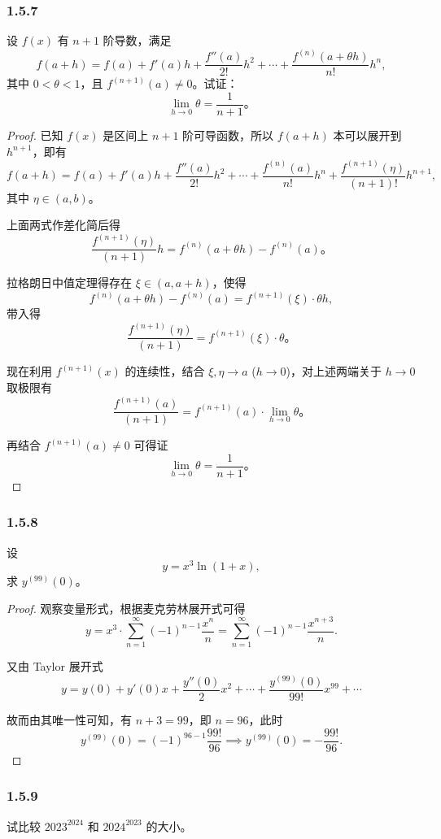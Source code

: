\documentclass[12pt]{ctexart}
\begin{document}
\subsubsection*{1.5.7}
设 $f(x)$ 有 $n+1$ 阶导数，满足
\[
f(a+h) = f(a) + f'(a)h + \frac{f''(a)}{2!}h^2 + \cdots + \frac{f^{(n)}(a+\theta h)}{n!}h^n,
\]
其中 $0 < \theta < 1$，且 $f^{(n+1)}(a) \neq 0$。试证：
\[
\lim_{h \to 0} \theta = \frac{1}{n+1}。
\]

\begin{proof}
已知 $f(x)$ 是区间上 $n+1$ 阶可导函数，所以 $f(a+h)$ 本可以展开到 $h^{n+1}$，即有
\[
f(a+h) = f(a) + f'(a)h + \frac{f''(a)}{2!}h^2 + \cdots + \frac{f^{(n)}(a)}{n!}h^n + \frac{f^{(n+1)}(\eta)}{(n+1)!}h^{n+1},
\]
其中 $\eta \in (a, b)$。

上面两式作差化简后得
\[
\frac{f^{(n+1)}(\eta)}{(n+1)}h = f^{(n)}(a + \theta h) - f^{(n)}(a)。
\]

拉格朗日中值定理得存在 $\xi \in (a, a + h)$，使得
\[
f^{(n)}(a + \theta h) - f^{(n)}(a) = f^{(n+1)}(\xi) \cdot \theta h,
\]
带入得
\[
\frac{f^{(n+1)}(\eta)}{(n+1)} = f^{(n+1)}(\xi) \cdot \theta。
\]

现在利用 $f^{(n+1)}(x)$ 的连续性，结合 $\xi, \eta \to a$ ($h \to 0$)，对上述两端关于 $h \to 0$ 取极限有
\[
\frac{f^{(n+1)}(a)}{(n+1)} = f^{(n+1)}(a) \cdot \lim_{h \to 0} \theta。
\]

再结合 $f^{(n+1)}(a) \neq 0$ 可得证
\[
\lim_{h \to 0} \theta = \frac{1}{n+1}。
\]
\end{proof}

\subsubsection*{1.5.8}
设
\[
y = x^3 \ln(1+x),
\]
求 $y^{(99)}(0)$。

\begin{proof}
观察变量形式，根据麦克劳林展开式可得
\[
y = x^3 \cdot \sum_{n=1}^\infty (-1)^{n-1} \frac{x^n}{n} = \sum_{n=1}^\infty (-1)^{n-1} \frac{x^{n+3}}{n}.
\]

又由 Taylor 展开式
\[
y = y(0) + y'(0)x + \frac{y''(0)}{2}x^2 + \cdots + \frac{y^{(99)}(0)}{99!}x^{99} + \cdots
\]

故而由其唯一性可知，有 $n+3=99$，即 $n=96$，此时
\[
y^{(99)}(0) = (-1)^{96-1} \frac{99!}{96} \implies y^{(99)}(0) = -\frac{99!}{96}.
\]
\end{proof}

\subsubsection*{1.5.9}
试比较 $2023^{2024}$ 和 $2024^{2023}$ 的大小。
\end{document}
